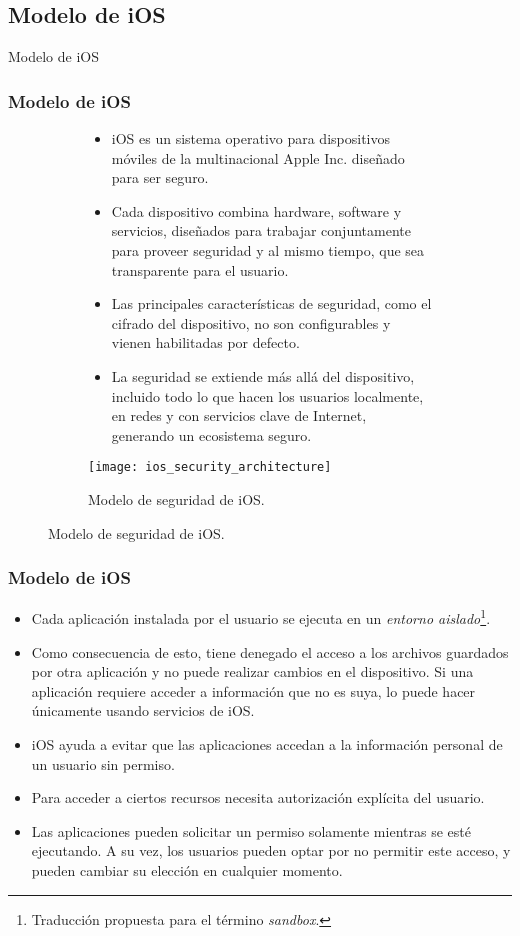 \subsection{Modelo de iOS}
\begin{frame}
 \begin{center}
  \LARGE Modelo de iOS
 \end{center}
\end{frame}
\begin{frame}
 \frametitle{Modelo de iOS}
 \begin{figure}[H]
  \begin{subfigure}{0.7\linewidth}
   \begin{itemize}
    \item iOS es un sistema operativo para dispositivos móviles de la multinacional Apple Inc. diseñado para ser
seguro. \pause
    \item Cada dispositivo combina hardware, software y servicios, diseñados para trabajar conjuntamente para proveer seguridad y al mismo tiempo, que sea transparente para el usuario. \pause
    \item Las principales características de seguridad, como el cifrado del dispositivo, no son configurables y vienen habilitadas por defecto.\pause
    \item La seguridad se extiende más allá del dispositivo, incluido todo lo que hacen los usuarios localmente, en redes y con servicios clave de Internet, generando un ecosistema seguro.
   \end{itemize}
  \end{subfigure}
  \begin{subfigure}{0.23\linewidth}\pause
    \centering
    \texttt{[image: ios\_security\_architecture]}
    \caption{Modelo de seguridad de iOS.}
  \end{subfigure}
\end{figure}
\end{frame}
\begin{frame}
 \frametitle{Modelo de iOS}
 \begin{itemize}
  \item Cada aplicación instalada por el usuario se ejecuta en un \emph{entorno aislado}\footnote{Traducción propuesta para el término \textit{sandbox}.}.\pause
  \item Como consecuencia de esto, tiene denegado el acceso a los archivos guardados por otra aplicación y no puede realizar cambios en el dispositivo. \pause Si una aplicación requiere acceder a información que no es suya, lo puede hacer únicamente usando servicios de iOS.\pause
  \item iOS ayuda a evitar que las aplicaciones accedan a la información personal de un usuario sin permiso.\pause
  \item Para acceder a ciertos recursos necesita autorización explícita del usuario.\pause
  \item Las aplicaciones pueden solicitar un permiso solamente mientras se esté ejecutando. \pause A su vez, los usuarios pueden optar por no permitir este acceso, y pueden cambiar su elección en cualquier momento.
 \end{itemize}
\end{frame}
